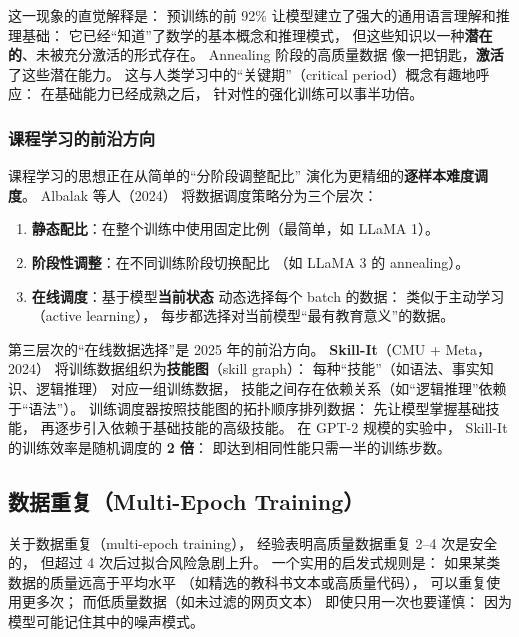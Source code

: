 这一现象的直觉解释是：
预训练的前 92\% 让模型建立了强大的通用语言理解和推理基础：
它已经“知道”了数学的基本概念和推理模式，
但这些知识以一种\textbf{潜在的}、未被充分激活的形式存在。
Annealing 阶段的高质量数据
像一把钥匙，\textbf{激活}了这些潜在能力。
这与人类学习中的“关键期”（critical period）概念有趣地呼应：
在基础能力已经成熟之后，
针对性的强化训练可以事半功倍。

\subsubsection{课程学习的前沿方向}

课程学习的思想正在从简单的“分阶段调整配比”
演化为更精细的\textbf{逐样本难度调度}。
Albalak 等人（2024）%
将数据调度策略分为三个层次：
\begin{enumerate}[noitemsep]
  \item \textbf{静态配比}：在整个训练中使用固定比例（最简单，如 LLaMA 1）。
  \item \textbf{阶段性调整}：在不同训练阶段切换配比
        （如 LLaMA 3 的 annealing）。
  \item \textbf{在线调度}：基于模型\textbf{当前状态}
        动态选择每个 batch 的数据：
        类似于主动学习（active learning），
        每步都选择对当前模型“最有教育意义”的数据。
\end{enumerate}

第三层次的“在线数据选择”是 2025 年的前沿方向。
\textbf{Skill-It}（CMU + Meta，2024）%
将训练数据组织为\textbf{技能图}（skill graph）：
每种“技能”（如语法、事实知识、逻辑推理）
对应一组训练数据，
技能之间存在依赖关系（如“逻辑推理”依赖于“语法”）。
训练调度器按照技能图的拓扑顺序排列数据：
先让模型掌握基础技能，
再逐步引入依赖于基础技能的高级技能。
在 GPT-2 规模的实验中，
Skill-It 的训练效率是随机调度的 \textbf{2 倍}：
即达到相同性能只需一半的训练步数。

\subsection{数据重复（Multi-Epoch Training）}

关于数据重复（multi-epoch training），
经验表明高质量数据重复 2--4 次是安全的，
但超过 4 次后过拟合风险急剧上升。
一个实用的启发式规则是：
如果某类数据的质量远高于平均水平
（如精选的教科书文本或高质量代码），
可以重复使用更多次；
而低质量数据（如未过滤的网页文本）
即使只用一次也要谨慎：
因为模型可能记住其中的噪声模式。

